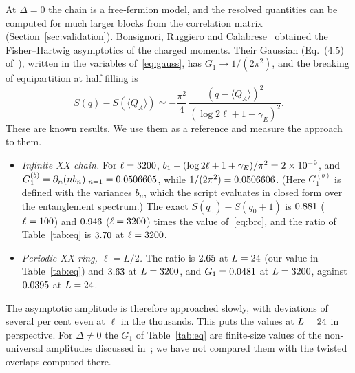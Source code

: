 \documentclass[11pt]{article}
\begin{document}
At $\Delta=0$ the chain is a free-fermion model, and the resolved quantities can be computed for much larger blocks from
the correlation matrix (Section~\ref{sec:validation}). Bonsignori, Ruggiero and Calabrese~\cite{bonsignori2019}
obtained the Fisher--Hartwig asymptotics of the charged moments. Their Gaussian (Eq.~(4.5) of~\cite{bonsignori2019}),
written in the variables of~\eqref{eq:gauss}, has $G_1\to1/(2\pi^2)$, and the breaking of equipartition at half filling
is~\cite[Eq.~(4.13)]{bonsignori2019}
\begin{equation}\label{eq:brc}
  S(q)-S(\langle Q_A\rangle)\simeq-\frac{\pi^2}4\,\frac{(q-\langle Q_A\rangle)^2}{(\log2\ell+1+\gamma_E)^2}.
\end{equation}
These are known results. We use them as a reference and measure the approach to them.
\begin{itemize}\itemsep0pt
\item \emph{Infinite XX chain.} For $\ell=3200$, $b_1-(\log2\ell+1+\gamma_E)/\pi^2=2\times10^{-9}$, and
$G_1^{(b)}=\partial_n(nb_n)|_{n=1}=0.0506605$, while $1/(2\pi^2)=0.0506606$. (Here $G_1^{(b)}$ is defined with the
variances $b_n$, which the script evaluates in closed form over the entanglement spectrum.) The exact $S(q_0)-S(q_0+1)$
is $0.881$ ($\ell=100$) and $0.946$ ($\ell=3200$) times the value
of~\eqref{eq:brc}, and the ratio of Table~\ref{tab:eq} is $3.70$ at $\ell=3200$.
\item \emph{Periodic XX ring, $\ell=L/2$.} The ratio is $2.65$ at $L=24$ (our value in
Table~\ref{tab:eq}) and $3.63$ at $L=3200$, and $G_1=0.0481$ at $L=3200$, against $0.0395$ at
$L=24$.
\end{itemize}
The asymptotic amplitude is therefore approached slowly, with deviations of several per cent even at $\ell$ in the
thousands. This puts the values at $L=24$ in perspective. For $\Delta\ne0$ the $G_1$ of Table~\ref{tab:eq} are
finite-size values of the non-universal amplitudes discussed in~\cite{estienne2021}; we have not compared them with the
twisted overlaps computed there.
\end{document}
